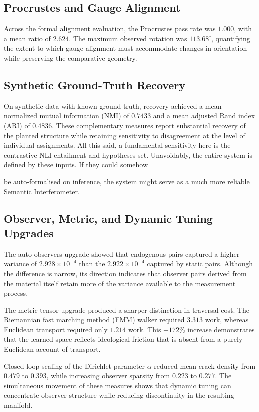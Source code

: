 \subsection{Procrustes and Gauge Alignment}
Across the formal alignment evaluation, the Procrustes pass rate was $1.000$, with a mean ratio of $2.624$. The maximum observed rotation was $113.68^{\circ}$, quantifying the extent to which gauge alignment must accommodate changes in orientation while preserving the comparative geometry.

\subsection{Synthetic Ground-Truth Recovery}
On synthetic data with known ground truth, recovery achieved a mean normalized mutual information (NMI) of $0.7433$ and a mean adjusted Rand index (ARI) of $0.4836$. These complementary measures report substantial recovery of the planted structure while retaining sensitivity to disagreement at the level of individual assignments.
All this said, a fundamental sensitivity here is the contrastive NLI entailment and
hypotheses set. Unavoidably, the entire system is defined by these inputs. If they could somehow

be auto-formalised on inference, the system might serve as a much more reliable Semantic
Interferometer.
\subsection{Observer, Metric, and Dynamic Tuning Upgrades}
The auto-observers upgrade showed that endogenous pairs captured a higher variance of $2.928 \times 10^{-4}$ than the $2.922 \times 10^{-4}$ captured by static pairs. Although the difference is narrow, its direction indicates that observer pairs derived from the material itself retain more of the variance available to the measurement process.

The metric tensor upgrade produced a sharper distinction in traversal cost. The Riemannian fast marching method (FMM) walker required $3.313$ work, whereas Euclidean transport required only $1.214$ work. This $+172\%$ increase demonstrates that the learned space reflects ideological friction that is absent from a purely Euclidean account of transport.

Closed-loop scaling of the Dirichlet parameter $\alpha$ reduced mean crack density from $0.479$ to $0.393$, while increasing observer sparsity from $0.223$ to $0.277$. The simultaneous movement of these measures shows that dynamic tuning can concentrate observer structure while reducing discontinuity in the resulting manifold.

